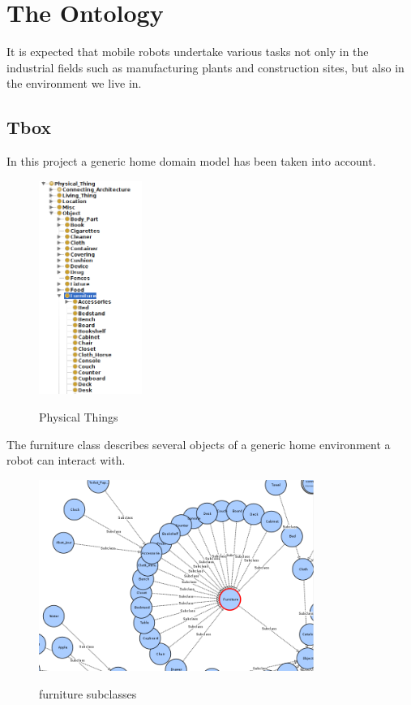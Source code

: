 

\section{The Ontology}
It is expected that mobile robots undertake various tasks not only in the industrial fields such as manufacturing plants and construction sites, but also in the environment we live in.

\subsection{Tbox}
In this project a generic home domain model has been taken into account. 

\begin{figure}[H]
\centering
\includegraphics[width=0.3\textwidth]{imgs/ontology.png}
\label{fig:ontologyThings}
\caption{Physical Things}
\end{figure}

The furniture class describes several objects of a generic home environment a robot can interact with.

\begin{figure}[H]
\centering
\includegraphics[width=0.8\textwidth]{imgs/ontology1.png}
\label{fig:furniture}
\caption{furniture subclasses}
\end{figure}

